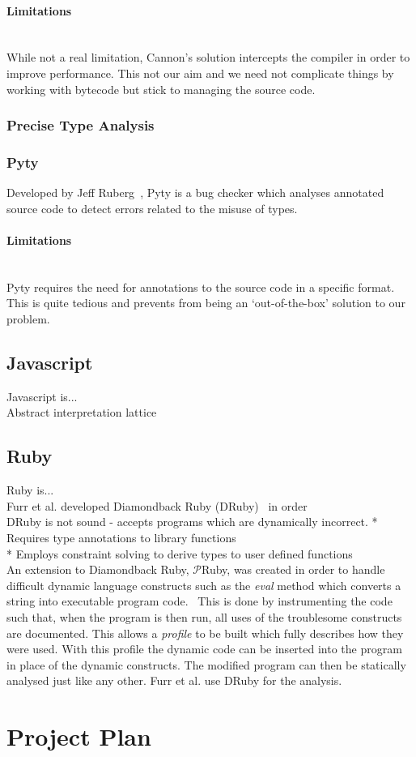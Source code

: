 \documentclass[12pt, titlepage]{article}
\begin{document}
\paragraph{Limitations}\mbox{}\\
While not a real limitation, Cannon's solution intercepts the compiler in order to improve performance. This not our aim and we need not complicate things by working with bytecode but stick to managing the source code.

\subsubsection*{Precise Type Analysis}

\subsubsection{Pyty}
Developed by Jeff Ruberg~\cite{pyty}, Pyty is a bug checker which analyses annotated source code to detect errors related to the misuse of types.
\paragraph{Limitations}\mbox{}\\
Pyty requires the need for annotations to the source code in a specific format. This is quite tedious and prevents from being an `out-of-the-box' solution to our problem.


\subsection{Javascript}
Javascript is... \\
Abstract interpretation lattice \\


\subsection{Ruby}
Ruby is... \\
Furr et al. developed Diamondback Ruby (DRuby)~\cite{furr09} in order  \\
DRuby is not sound - accepts programs which are dynamically incorrect.
* Requires type annotations to library functions \\
* Employs constraint solving to derive types to user defined functions \\
An extension to Diamondback Ruby, $\mathcal{P}$Ruby, was created in order to handle difficult dynamic language constructs such as the \textit{eval} method which converts a string into executable program code.~\cite{pRuby} This is done by instrumenting the code such that, when the program is then run, all uses of the troublesome constructs are documented. This allows a \textit{profile} to be built which fully describes how they were used. With this profile the dynamic code can be inserted into the program in place of the dynamic constructs. The modified program can then be statically analysed just like any other. Furr et al. use DRuby for the analysis.

\section{Project Plan}


{}

\end{document}
